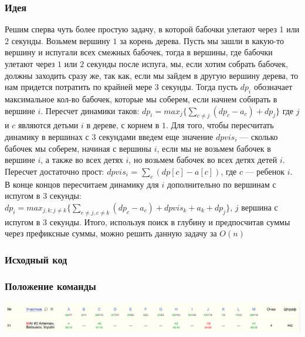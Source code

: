 \documentclass[12pt]{article}
\begin{document}
\subsubsection*{Идея}
Решим сперва чуть более простую задачу, в которой бабочки улетают через 1 или 2 секунды. Возьмем вершину $1$ за корень дерева.
Пусть мы зашли в какую-то вершину и испугали всех смежных бабочек, тогда в вершины, где бабочки улетают через $1$ или $2$ секунды после испуга, мы, если хотим собрать бабочек, должны заходить сразу же, так как, если мы зайдем в другую вершину дерева, то нам придется потратить по крайней мере $3$ секунды.
Тогда пусть $dp_i$ обозначает максимальное кол-во бабочек, которые мы соберем, если начнем собирать в вершине $i$. Пересчет динамики таков: $dp_i = max_{j}\{\sum_{c \neq j}(dp_c - a_c) + dp_j\}$ где $j$ и $c$ являются детьми $i$ в дереве, с корнем в $1$.
Для того, чтобы пересчитать динамику в вершинах с $3$ секундами введем еще значение $dpvis_i$ --- сколько бабочек мы соберем, начиная с вершины $i$, если мы не возьмем бабочек в вершине $i$, а также во всех детях $i$, но возьмем бабочек во всех детях детей $i$. Пересчет достаточно прост: $dpvis_i$ = $\sum_{c}(dp[c] - a[c])$, где $c$ --- ребенок $i$. В конце концов пересчитаем динамику для $i$ дополнительно по вершинам с испугом в $3$ секунды: $dp_i = max_{j, k : j \neq k}\{\sum_{c \neq j, c \neq k}(dp_c - a_c) + dpvis_k + a_k + dp_j\}$, $j$ вершина с испугом в 3 секунды. Итого, используя поиск в глубину и предпосчитав суммы через префиксные суммы, можно решить данную задачу за $O(n)$
\subsubsection*{Исходный код}

\subsubsection*{Положение команды}
\includegraphics[scale=0.25]{images/gp_nanjing.png}\newline\noindent
\pagebreak


\end{document}
